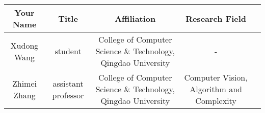 \documentclass[10pt,conference,letterpaper]{IEEEtran}
\begin{document}
    \begin{table*}[hp]
        \begin{center}
            \begin{tabular}{ccccc}
                \toprule
                Your Name    & Title               & Affiliation                                                   & Research Field                            \\
                \midrule
                Xudong Wang  & student             & College of Computer Science \& Technology, Qingdao University & -                         \\
                Zhimei Zhang & assistant professor & College of Computer Science \& Technology, Qingdao University & Computer Vision, Algorithm and Complexity         \\
                \bottomrule
            \end{tabular}
        \end{center}
    \end{table*}

    
    
\end{document}
